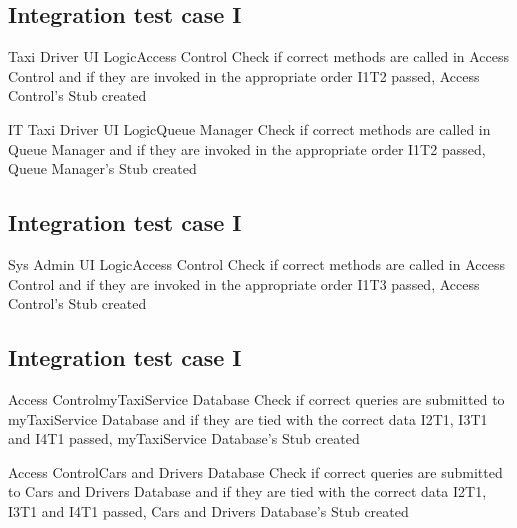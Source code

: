 
\subsection{Integration test case I}
\setcounter{testcounter}{1}
{Taxi Driver UI Logic\textrightarrow Access Control}
{
}
{}
{Check if correct methods are called in Access Control and if they are invoked in the appropriate order}
{I1T2 passed, Access Control's Stub created}

\vspace{2ex}
\tctable
{IT}
{Taxi Driver UI Logic\textrightarrow Queue Manager}
{
}
{}
{Check if correct methods are called in Queue Manager and if they are invoked in the appropriate order}
{I1T2 passed, Queue Manager's Stub created}


\subsection{Integration test case I}
\setcounter{testcounter}{1}
{Sys Admin UI Logic\textrightarrow Access Control}
{
}
{}
{Check if correct methods are called in Access Control and if they are invoked in the appropriate order}
{I1T3 passed, Access Control's Stub created}


\subsection{Integration test case I}
\setcounter{testcounter}{1}
{Access Control\textrightarrow myTaxiService Database}
{
}
{}
{Check if correct queries are submitted to myTaxiService Database and if they are tied with the correct data}
{I2T1, I3T1 and I4T1 passed, myTaxiService Database's Stub created}

\vspace{2ex}
{Access Control\textrightarrow Cars and Drivers Database}
{
}
{}
{Check if correct queries are submitted to Cars and Drivers Database and if they are tied with the correct data}
{I2T1, I3T1 and I4T1 passed, Cars and Drivers Database's Stub created}

